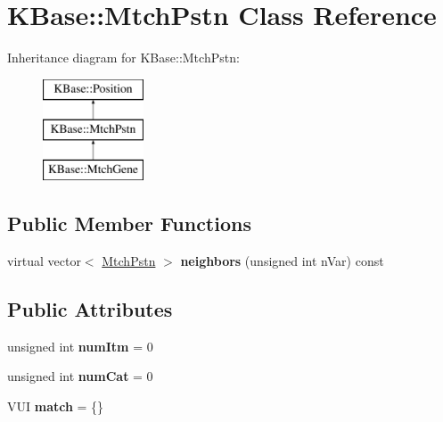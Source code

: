 \hypertarget{class_k_base_1_1_mtch_pstn}{\section{K\-Base\-:\-:Mtch\-Pstn Class Reference}
\label{class_k_base_1_1_mtch_pstn}
}
Inheritance diagram for K\-Base\-:\-:Mtch\-Pstn\-:\begin{figure}[H]
\begin{center}
\leavevmode
\includegraphics[height=3.000000cm]{class_k_base_1_1_mtch_pstn}
\end{center}
\end{figure}
\subsection*{Public Member Functions}
\begin{DoxyCompactItemize}
\item 
\hypertarget{class_k_base_1_1_mtch_pstn_ad61e5928faa5ba280d1c838e6136ad5d}{virtual vector$<$ \hyperlink{class_k_base_1_1_mtch_pstn}{Mtch\-Pstn} $>$ {\bfseries neighbors} (unsigned int n\-Var) const }\label{class_k_base_1_1_mtch_pstn_ad61e5928faa5ba280d1c838e6136ad5d}

\end{DoxyCompactItemize}
\subsection*{Public Attributes}
\begin{DoxyCompactItemize}
\item 
\hypertarget{class_k_base_1_1_mtch_pstn_a60aa0c0f6712782c4ff8f5990784667c}{unsigned int {\bfseries num\-Itm} = 0}\label{class_k_base_1_1_mtch_pstn_a60aa0c0f6712782c4ff8f5990784667c}

\item 
\hypertarget{class_k_base_1_1_mtch_pstn_ac73b103e757c1700c16ecf4348859711}{unsigned int {\bfseries num\-Cat} = 0}\label{class_k_base_1_1_mtch_pstn_ac73b103e757c1700c16ecf4348859711}

\item 
\hypertarget{class_k_base_1_1_mtch_pstn_a67f468b2b5b27b2c142a83dbf8495743}{V\-U\-I {\bfseries match} = \{\}}\label{class_k_base_1_1_mtch_pstn_a67f468b2b5b27b2c142a83dbf8495743}

\end{DoxyCompactItemize}
